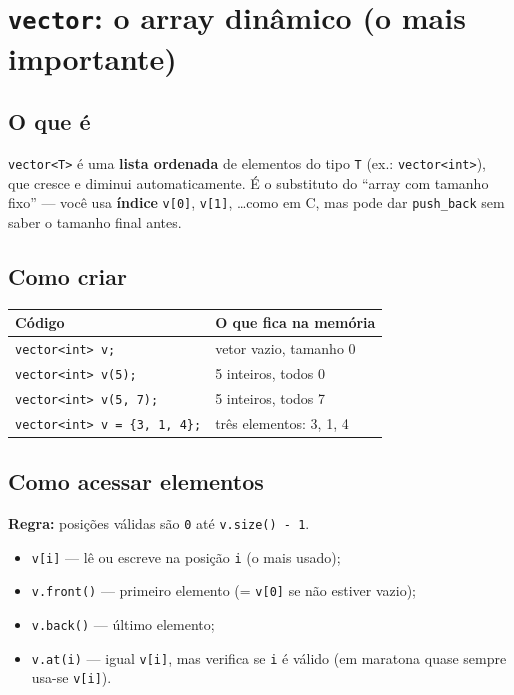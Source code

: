 
\section{\texttt{vector}: o array dinâmico (o mais importante)}

\subsection{O que é}

\texttt{vector<T>} é uma \textbf{lista ordenada} de elementos do tipo \texttt{T} (ex.: \texttt{vector<int>}), que cresce e diminui automaticamente.
É o substituto do ``array com tamanho fixo'' --- você usa \textbf{índice} \texttt{v[0]}, \texttt{v[1]}, \ldots como em C, mas pode dar \texttt{push\_back} sem saber o tamanho final antes.

\subsection{Como criar}

\begin{center}
\small
\begin{tabular}{@{}ll@{}}
  \toprule
  \textbf{Código} & \textbf{O que fica na memória} \\
  \midrule
  \texttt{vector<int> v;} & vetor vazio, tamanho 0 \\
  \texttt{vector<int> v(5);} & 5 inteiros, todos 0 \\
  \texttt{vector<int> v(5, 7);} & 5 inteiros, todos 7 \\
  \texttt{vector<int> v = \{3, 1, 4\};} & três elementos: 3, 1, 4 \\
  \bottomrule
\end{tabular}
\end{center}

\subsection{Como acessar elementos}

\textbf{Regra:} posições válidas são \texttt{0} até \texttt{v.size() - 1}.

\begin{itemize}[nosep]
  \item \texttt{v[i]} --- lê ou escreve na posição \texttt{i} (o mais usado);
  \item \texttt{v.front()} --- primeiro elemento (= \texttt{v[0]} se não estiver vazio);
  \item \texttt{v.back()} --- último elemento;
  \item \texttt{v.at(i)} --- igual \texttt{v[i]}, mas verifica se \texttt{i} é válido (em maratona quase sempre usa-se \texttt{v[i]}).
\end{itemize}

